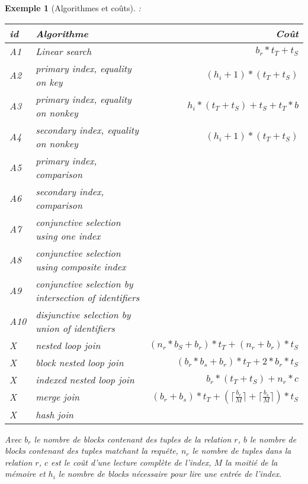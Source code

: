 \documentclass[landscape]{article}
\newcommand{\1}{\mathbbm{1}}
\newcommand{\0}{\mathbbm{0}}
\newtheorem{ex}{Exemple}
\begin{document}
\begin{multicols}{2}
    \begin{ex}[Algorithmes et coûts]:\\
        \begin{tabularx}{0.5\textwidth}{lXr}
            \hline \textbf{id} & \textbf{Algorithme} & \textbf{Coût} \\
            \hline
            A1  & Linear search & $b_r * t_T + t_S$ \\
            A2  & primary index, equality on key & $(h_i + 1) * (t_T + t_S)$ \\
            A3  & primary index, equality on nonkey & $h_i * (t_T + t_S) + t_S + t_T * b$ \\ 
            A4  & secondary index, equality on nonkey & $(h_i + 1) * (t_T + t_S)$ \\
            A5  & primary index, comparison & \\
            A6  & secondary index, comparison & \\
            A7  & conjunctive selection using one index & \\
            A8  & conjunctive selection using composite index & \\
            A9  & conjunctive selection by intersection of identifiers & \\
            A10 & disjunctive selection by union of identifiers & \\
            X   & nested loop join & $(n_r * b_S + b_r) * t_T + (n_r + b_r) * t_S$ \\
            X   & block nested loop join & $(b_r*b_s + b_r) * t_T + 2 * b_r * t_S$ \\
            X   & indexed nested loop join & $b_r * (t_T + t_S) + n_r * c$ \\
            X   & merge join & $(b_r + b_s) * t_T + (\lceil \frac{b_r}{M} \rceil
                                                     + \lceil \frac{b_s}{M} \rceil) * t_S$ \\
            X   & hash join & \\
            \hline
        \end{tabularx}

        Avec $b_r$ le nombre de blocks contenant des tuples de la relation $r$,
        $b$ le nombre de blocks contenant des tuples matchant la requête, $n_r$
        le nombre de tuples dans la relation $r$, $c$ est le coût d'une
        lecture complète de l'index, $M$ la moitié de la mémoire et
        $h_i$ le nombre de blocks nécessaire pour lire une entrée de l'index.
    \end{ex}


\end{multicols}
\end{document}
